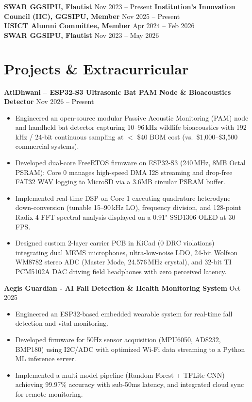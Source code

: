 \documentclass[10pt,a4paper]{article}%
\begin{document}
\noindent \textbf{SWAR GGSIPU, Flautist} \hfill Nov 2023 -- Present \vspace{8pt}%
\noindent \textbf{Institution's Innovation Council (IIC), GGSIPU, Member} \hfill Nov 2025 -- Present \vspace{8pt}\\%
\noindent \textbf{USICT Alumni Committee, Member} \hfill Apr 2024 -- Feb 2026 \vspace{8pt}\\%
\noindent \textbf{SWAR GGSIPU, Flautist} \hfill Nov 2023 -- May 2026 \vspace{8pt}%
\newpage \section*{Projects \& Extracurricular}%
\noindent \textbf{AtiDhwani -- ESP32-S3 Ultrasonic Bat PAM Node \& Bioacoustics Detector} \hfill Nov 2026 -- Present%
\begin{itemize}[leftmargin=15pt, nosep, topsep=0pt]%
\item Engineered an open-source modular Passive Acoustic Monitoring (PAM) node and handheld bat detector capturing 10--96\,kHz wildlife bioacoustics with 192\,kHz / 24-bit continuous sampling at $<$ \$40 BOM cost (vs.\ \$1,000--\$3,500 commercial systems).%
\item Developed dual-core FreeRTOS firmware on ESP32-S3 (240\,MHz, 8MB Octal PSRAM): Core 0 manages high-speed DMA I2S streaming and drop-free FAT32 WAV logging to MicroSD via a 3.6MB circular PSRAM buffer.%
\item Implemented real-time DSP on Core 1 executing quadrature heterodyne down-conversion (tunable 15--90\,kHz LO), frequency division, and 128-point Radix-4 FFT spectral analysis displayed on a 0.91" SSD1306 OLED at 30\,FPS.%
\item Designed custom 2-layer carrier PCB in KiCad (0 DRC violations) integrating dual MEMS microphones, ultra-low-noise LDO, 24-bit Wolfson WM8782 stereo ADC (Master Mode, 24.576\,MHz crystal), and 32-bit TI PCM5102A DAC driving field headphones with zero perceived latency.%
\end{itemize} \vspace{8pt}%
\noindent \textbf{Aegis Guardian - AI Fall Detection \& Health Monitoring System} \hfill Oct 2025%
\begin{itemize}[leftmargin=15pt, nosep, topsep=0pt]%
\item Engineered an ESP32-based embedded wearable system for real-time fall detection and vital monitoring.%
\item Developed firmware for 50Hz sensor acquisition (MPU6050, AD8232, BMP180) using I2C/ADC with optimized Wi-Fi data streaming to a Python ML inference server.%
\item Implemented a multi-model pipeline (Random Forest + TFLite CNN) achieving 99.97\% accuracy with sub-50ms latency, and integrated cloud sync for remote monitoring.%
\end{itemize} \vspace{8pt}%
\end{document}
